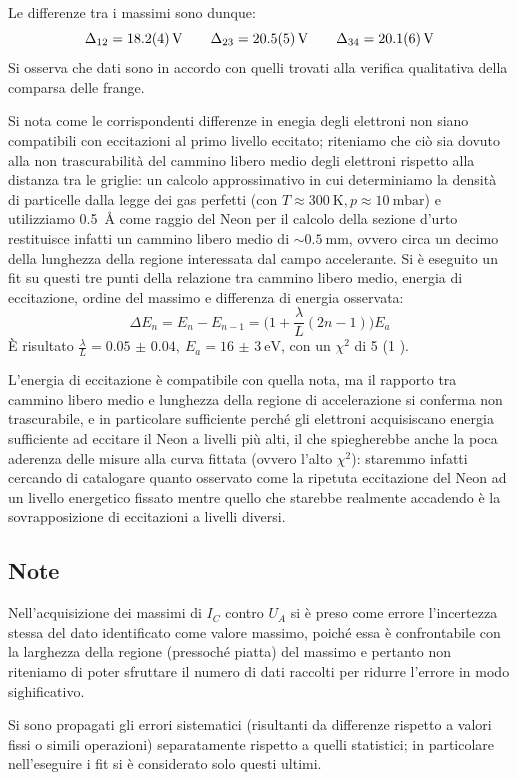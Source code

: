 	Le differenze tra i massimi sono dunque:
	$$\Delta_{12}=\SI{18.2\pm 0.4}{\volt} \qquad \Delta_{23}=\SI{20.5 \pm 0.5}{\volt} \qquad \Delta_{34}=\SI{20.1 \pm 0.6}{\volt}$$
	Si osserva che dati sono in accordo con quelli trovati alla
	verifica qualitativa della comparsa delle frange.

	Si nota come le corrispondenti differenze in enegia degli elettroni non siano
	compatibili con eccitazioni al primo livello eccitato;
	riteniamo che ciò sia dovuto alla non trascurabilità del cammino libero medio
	degli elettroni rispetto alla distanza tra le griglie: un calcolo approssimativo
	in cui determiniamo la densità di particelle dalla legge dei gas perfetti
	(con $T \approx \SI{300}{\K}, p \approx \SI{10}{\milli\bar}$) e utilizziamo
	\SI{0.5}{\angstrom} come raggio del Neon per il calcolo della sezione d'urto
	restituisce infatti un cammino libero medio di $\sim \SI{0.5}{\mm}$,
	ovvero circa un decimo della lunghezza della regione interessata dal campo accelerante.
	Si è eseguito un fit su questi tre punti della relazione tra cammino libero medio,
	energia di eccitazione, ordine del massimo e differenza di energia osservata:
	$$ \Delta E_n = E_n - E_{n-1} = \big(1 + \frac{\lambda}{L}(2n - 1)\big) E_a $$
	È risultato $\frac{\lambda}{L} = \SI{0.05(4)}, \ E_a = \SI{16(3)}{\eV}$, con un $\chi^2$ di 5 (1 \dof).

	L'energia di eccitazione è compatibile con quella nota, ma
	il rapporto tra cammino libero medio e lunghezza della regione di accelerazione
	si conferma non trascurabile, e in particolare sufficiente perché gli elettroni acquisiscano
	energia sufficiente ad eccitare il Neon a livelli più alti, il che
	spiegherebbe anche la poca aderenza delle misure alla curva fittata (ovvero
	l'alto $\chi^2$): staremmo infatti cercando di catalogare quanto osservato
	come la ripetuta eccitazione del Neon ad un livello energetico fissato
	mentre quello che starebbe realmente accadendo è la sovrapposizione di
	eccitazioni a livelli diversi.

\subsection{Note}
Nell'acquisizione dei massimi di $I_C$ contro $U_A$ si è preso come errore
l'incertezza stessa del dato identificato come valore massimo, poiché essa è confrontabile con
la larghezza della regione (pressoché piatta) del massimo e pertanto non riteniamo
di poter sfruttare il numero di dati raccolti per ridurre l'errore in modo sighificativo.

Si sono propagati gli errori sistematici (risultanti da differenze rispetto a valori fissi
o simili operazioni) separatamente rispetto a quelli statistici; in particolare
nell'eseguire i fit si è considerato solo questi ultimi.
